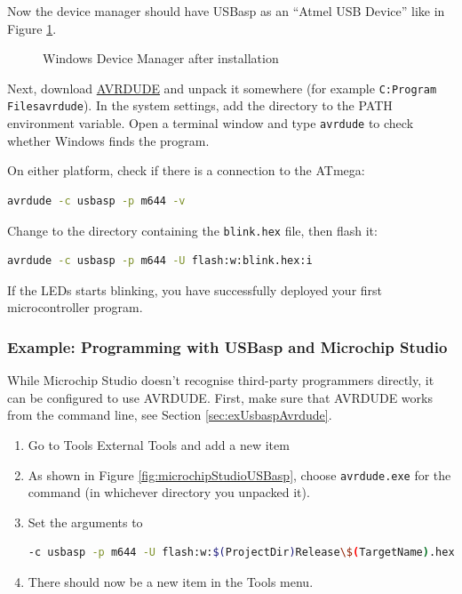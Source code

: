\documentclass{article}
\newcommand{\file}[1]{\texttt{#1}}
\begin{document}
Now the device manager should have USBasp as an ``Atmel USB Device'' like in Figure \ref{fig:deviceManagerAfter}. 
\begin{figure}[htb]
\centering
{}
\caption{Windows Device Manager after installation}
\label{fig:deviceManagerAfter}
\end{figure}

Next, download \href{https://github.com/avrdudes/avrdude/releases}{AVRDUDE} and unpack it somewhere (for example \file{C:Program Files\symbol{`\\}avrdude}). In the system settings, add the directory to the PATH environment variable. Open a terminal window and type \lstinline[language=bash]{avrdude} to check whether Windows finds the program. 

On either platform, check if there is a connection to the ATmega:
\begin{lstlisting}[language=bash]
avrdude -c usbasp -p m644 -v
\end{lstlisting}

Change to the directory containing the \file{blink.hex} file, then flash it:
\begin{lstlisting}[language=bash]
avrdude -c usbasp -p m644 -U flash:w:blink.hex:i
\end{lstlisting}

If the LEDs starts blinking, you have successfully deployed your first microcontroller program. 

\FloatBarrier
\subsubsection{Example: Programming with USBasp and Microchip Studio}\label{sec:exMchpStudioProg}
While Microchip Studio doesn't recognise third-party programmers directly, it can be configured to use AVRDUDE. First, make sure that AVRDUDE works from the command line, see Section \ref{sec:exUsbaspAvrdude}. 

\begin{enumerate}
\item Go to Tools \textrightarrow{} External Tools and add a new item 
\item As shown in Figure \ref{fig:microchipStudioUSBasp}, choose \file{avrdude.exe} for the command (in whichever directory you unpacked it). 
\item Set the arguments to
\begin{lstlisting}[language=bash]
-c usbasp -p m644 -U flash:w:$(ProjectDir)Release\$(TargetName).hex:i
\end{lstlisting}
\item There should now be a new item in the Tools menu. 
\end{enumerate}
\end{document}
